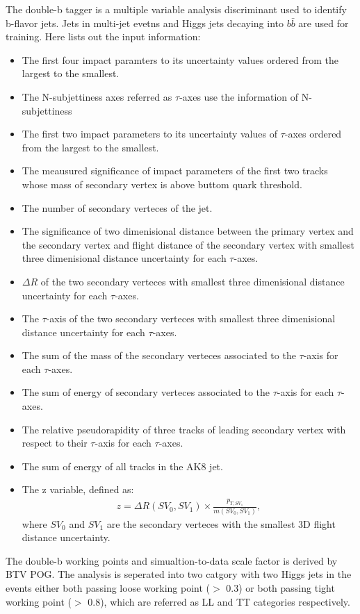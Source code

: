 The double-b tagger is a multiple variable analysis discriminant used to identify b-flavor jets. Jets in multi-jet evetns and Higgs jets decaying into $b\bar{b}$ are used for training. Here lists out the input information:
\begin{itemize}
\item The first four impact paramters to its uncertainty values ordered from the largest to the smallest.
\item The  N-subjettiness axes referred as $\tau $-axes use the information of N-subjettiness
\item The first two impact parameters to its uncertainty values of $\tau $-axes ordered from the largest to the smallest.
\item The meausured significance of impact parameters of the first two tracks whose mass of secondary vertex is above buttom quark threshold.
\item The number of secondary verteces of the jet.
\item The significance of two dimenisional distance between the primary vertex and the secondary vertex and flight distance of the secondary vertex with smallest three dimenisional distance uncertainty for each $\tau $-axes.
\item $\Delta R$ of the two secondary verteces with smallest three dimenisional distance uncertainty for each $\tau $-axes.
\item The $\tau $-axis of the two secondary verteces with smallest three dimenisional distance uncertainty for each $\tau $-axes.
\item The sum of the mass of the secondary verteces associated to the $\tau $-axis for each $\tau $-axes.
\item The sum of energy of secondary verteces associated to the $\tau $-axis for each $\tau $-axes.
\item The relative pseudorapidity of three tracks of leading secondary vertex with respect to their $\tau $-axis for each $\tau $-axes.
\item The sum of energy of all tracks in the AK8 jet.
\item The z variable, defined as: 
\begin{equation} \label{eq7}
\begin{split}
z = \Delta R (SV_0, SV_1) \times \frac{p_{T,SV_1}}{m(SV_0,SV_1)}, 
\end{split}
\end{equation}
where $SV_0$ and $SV_1$ are the secondary verteces with the smallest 3D flight distance uncertainty.
\end{itemize} 
The double-b working points and simualtion-to-data scale factor is derived by BTV POG.
The analysis is seperated into two catgory with two Higgs jets in the events either both passing loose working point ($>$ 0.3) or both passing tight working point ($>$ 0.8), which are referred as LL and TT categories respectively.



